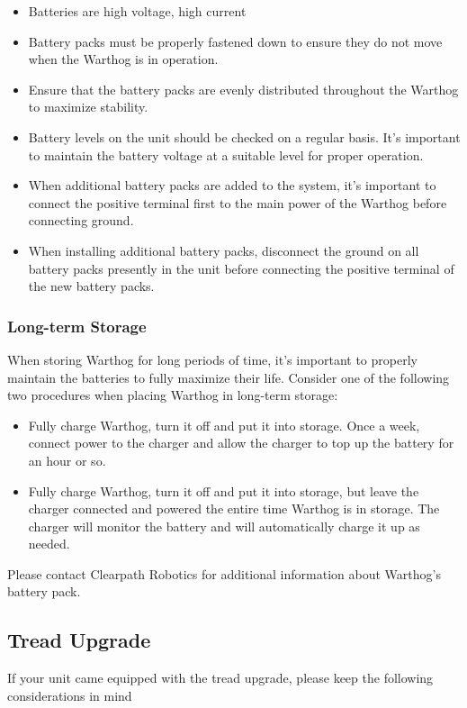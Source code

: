 \documentclass[]{clearpath-latex/clearpath-manual}
\begin{document}
\begin{itemize}[nolistsep]
  \item Batteries are high voltage, high current
  \item Battery packs must be properly fastened down to ensure they do not move when the Warthog is in operation.
  \item Ensure that the battery packs are evenly distributed throughout the Warthog to maximize stability.
  \item Battery levels on the unit should be checked on a regular basis.  It's important to maintain the battery voltage at a suitable level for proper operation.
  \item When additional battery packs are added to the system, it's important to connect the positive terminal first to the main power of the Warthog before connecting ground.
  \item When installing additional battery packs, disconnect the ground on all battery packs presently in the unit before connecting the positive terminal of the new battery packs.
\end{itemize}

\subsubsection{Long-term Storage}

When storing Warthog for long periods of time, it's important to properly maintain the batteries to fully maximize their life.  Consider one of the following two procedures when placing Warthog in long-term storage:

\begin{itemize}[nolistsep]
  \item Fully charge Warthog, turn it off and put it into storage.  Once a week, connect power to the charger and allow the charger to top up the battery for an hour or so.
  \item Fully charge Warthog, turn it off and put it into storage, but leave the charger connected and powered the entire time Warthog is in storage.  The charger will monitor the battery and will automatically charge it up as needed.
\end{itemize}


Please contact Clearpath Robotics for additional information about Warthog's battery pack.

\subsection{Tread Upgrade}
If your unit came equipped with the tread upgrade, please keep the following considerations in mind
\end{document}
